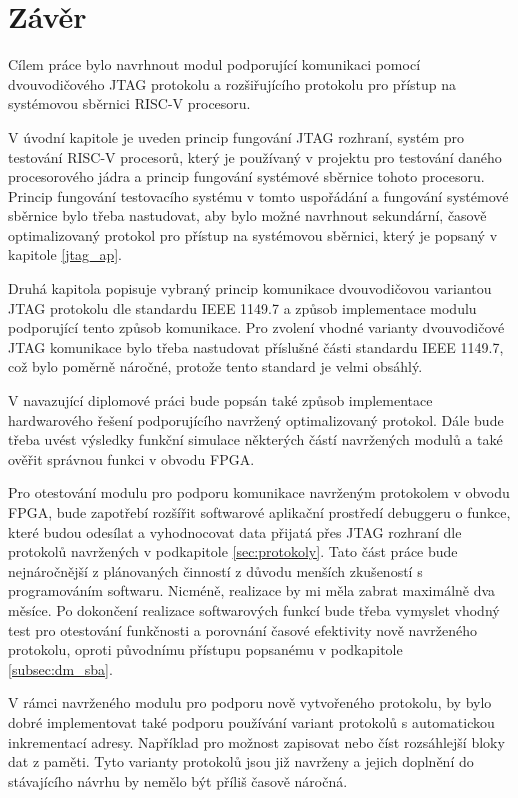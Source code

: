 \chapter*{Závěr}
{}

Cílem práce bylo navrhnout modul podporující komunikaci pomocí dvouvodičového \acs{JTAG} protokolu a rozšiřujícího protokolu pro přístup na systémovou sběrnici \acs{RISC-V} procesoru.

V úvodní kapitole je uveden princip fungování \acs{JTAG} rozhraní, systém pro testování \acs{RISC-V} procesorů, který je používaný v projektu pro testování daného procesorového jádra a princip fungování systémové sběrnice tohoto procesoru. Princip fungování testovacího systému v tomto uspořádání a fungování systémové sběrnice bylo třeba nastudovat, aby bylo možné navrhnout sekundární, časově optimalizovaný protokol pro přístup na systémovou sběrnici, který je popsaný v kapitole \ref{jtag_ap}.

Druhá kapitola popisuje vybraný princip komunikace dvouvodičovou variantou \acs{JTAG} protokolu dle standardu IEEE 1149.7 a způsob implementace modulu podporující tento způsob komunikace. Pro zvolení vhodné varianty dvouvodičové \acs{JTAG} komunikace bylo třeba nastudovat příslušné části standardu IEEE 1149.7, což bylo poměrně náročné, protože tento standard je velmi obsáhlý.

V navazující diplomové práci bude popsán také způsob implementace hardwarového řešení podporujícího navržený optimalizovaný protokol. Dále bude třeba uvést výsledky funkční simulace některých částí navržených modulů a také ověřit správnou funkci v obvodu \acs{FPGA}.

Pro otestování modulu pro podporu komunikace navrženým protokolem v obvodu \acs{FPGA}, bude zapotřebí rozšířit softwarové aplikační prostředí debuggeru o funkce, které budou odesílat a vyhodnocovat data přijatá přes \acs{JTAG} rozhraní dle protokolů navržených v podkapitole \ref{sec:protokoly}. Tato část práce bude nejnáročnější z plánovaných činností z důvodu menších zkušeností s programováním softwaru. Nicméně, realizace by mi měla zabrat maximálně dva měsíce. Po dokončení realizace softwarových funkcí bude třeba vymyslet vhodný test pro otestování funkčnosti a porovnání časové efektivity nově navrženého protokolu, oproti původnímu přístupu popsanému v podkapitole \ref{subsec:dm_sba}.

V rámci navrženého modulu pro podporu nově vytvořeného protokolu, by bylo dobré implementovat také podporu používání variant protokolů s automatickou inkrementací adresy. Například pro možnost zapisovat nebo číst rozsáhlejší bloky dat z paměti. Tyto varianty protokolů jsou již navrženy a jejich doplnění do stávajícího návrhu by nemělo být příliš časově náročná.